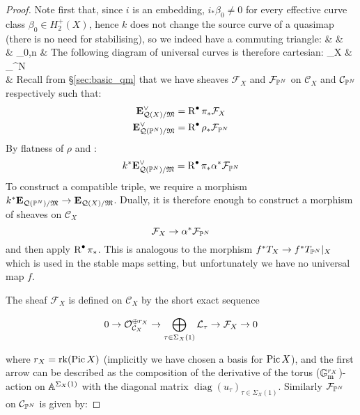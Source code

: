 \begin{proof} Note first that, since $i$ is an embedding, $i_*\beta_0\neq 0$ for every effective curve class $\beta_0\in H_2^+(X)$, hence $k$ does not change the source curve of a quasimap (there is no need for stabilising), so we indeed have a commuting triangle:
\bcd
{} \ar[rr,"k"] \ar[rd] & &  \ar[ld] \\
& \MM_{0,n} & 
\ecd
The following diagram of universal curves is therefore cartesian:
\bcd
{}_X \ar[r,"\alpha"] \ar[d,"\pi"]  & _{\PP^N} \ar[d,"\rho"] \\
 \ar[r,"k"] & 
\ecd
Recall from \S \ref{sec:basic_qm} that we have sheaves $\mathcal{F}_X$ and $\mathcal{F}_{\mathbb P^N}$ on $\mathcal{C}_X$ and $\mathcal{C}_{\mathbb P^N}$ respectively such that:
\begin{align*} \mathbf{E}_{\mathcal{Q}(X)/\mathfrak M}^\vee & = \operatorname{R}^{\bullet} \pi_* \mathcal{F}_X \\
\mathbf{E}_{\mathcal{Q}(\mathbb P^N)/\mathfrak M}^\vee & = \operatorname{R}^{\bullet} \rho_* \mathcal{F}_{\mathbb P^N} \end{align*}
By flatness of $\rho$ and \cite[Proposition III.9.3]{HAR}:
\begin{equation*} k^* \mathbf{E}_{\mathcal{Q}(\mathbb P^N)/\mathfrak M}^\vee = \operatorname{R}^{\bullet} \pi_* \alpha^* \mathcal{F}_{\mathbb P^N} \end{equation*}
To construct a compatible triple, we require a morphism $k^* \mathbf{E}_{\mathcal{Q}(\mathbb P^N)/\mathfrak M} \rightarrow \mathbf{E}_{\mathcal{Q}(X)/\mathfrak M}$. Dually, it is therefore enough to construct a morphism of sheaves on $\mathcal{C}_X$
\begin{equation*} \mathcal{F}_X \rightarrow \alpha^* \mathcal{F}_{\mathbb P^N} \end{equation*}
and then apply $\operatorname{R}^{\bullet} \pi_*$. This is analogous to the morphism $f^* T_X \rightarrow f^* T_{\mathbb P^N}|_X$ which is used in the stable maps setting, but unfortunately we have no universal map $f$.

The sheaf $\mathcal{F}_X$ is defined on $\mathcal{C}_X$ by the short exact sequence

\begin{equation*} 0 \rightarrow \mathcal{O}_{\mathcal{C}_X}^{\oplus r_X} \rightarrow \bigoplus_{\tau\in\Sigma_X(1)} \mathcal{L}_\tau \rightarrow \mathcal{F}_X \rightarrow 0 \end{equation*}

\noindent where $r_X = \operatorname{rk}(\operatorname{Pic} X)$ (implicitly we have chosen a basis for $\operatorname{Pic} X$), and the first arrow can be described as the composition of the derivative of the torus ($\mathbb{G}_{\text{m}}^{r_X}$)-action on $\mathbb{A}^{\Sigma_X(1)}$ with the diagonal matrix $\operatorname{diag}(u_\tau)_{\tau\in\Sigma_X(1)}$.
Similarly $\mathcal{F}_{\mathbb P^N}$ on $\mathcal{C}_{\mathbb P^N}$ is given by:


\end{proof}

